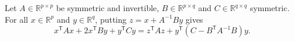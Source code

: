 Let $A\in\mathbb R^{p\times p}$ be symmetric and invertible,
$B\in\mathbb R^{p\times q}$ and $C\in\mathbb R^{q\times q}$ symmetric.
For all $x\in\mathbb R^p$ and $y\in\mathbb R^q$, putting
$z=x+A^{-1}By$ gives
\[
 x^{\mathsf T}Ax+2x^{\mathsf T}By+y^{\mathsf T}Cy
 =z^{\mathsf T}Az+y^{\mathsf T}(C-B^{\mathsf T}A^{-1}B)y.
\]